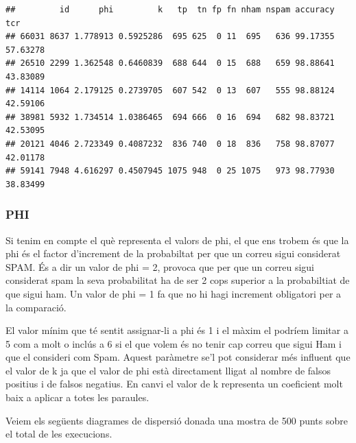 \documentclass[]{article}
\begin{document}
\begin{verbatim}
##         id      phi         k   tp  tn fp fn nham nspam accuracy      tcr
## 66031 8637 1.778913 0.5925286  695 625  0 11  695   636 99.17355 57.63278
## 26510 2299 1.362548 0.6460839  688 644  0 15  688   659 98.88641 43.83089
## 14114 1064 2.179125 0.2739705  607 542  0 13  607   555 98.88124 42.59106
## 38981 5932 1.734514 1.0386465  694 666  0 16  694   682 98.83721 42.53095
## 20121 4046 2.723349 0.4087232  836 740  0 18  836   758 98.87077 42.01178
## 59141 7948 4.616297 0.4507945 1075 948  0 25 1075   973 98.77930 38.83499
\end{verbatim}

\hypertarget{phi}{%
\subsubsection{PHI}\label{phi}}

Si tenim en compte el què representa el valors de phi, el que ens trobem
és que la phi és el factor d'increment de la probabiltat per que un
correu sigui considerat SPAM. És a dir un valor de phi = 2, provoca que
per que un correu sigui considerat spam la seva probabilitat ha de ser 2
cops superior a la probabiltiat de que sigui ham. Un valor de phi = 1 fa
que no hi hagi increment obligatori per a la comparació.

El valor mínim que té sentit assignar-li a phi és 1 i el màxim el
podríem limitar a 5 com a molt o inclús a 6 si el que volem és no tenir
cap correu que sigui Ham i que el consideri com Spam. Aquest paràmetre
se'l pot considerar més influent que el valor de k ja que el valor de
phi està directament lligat al nombre de falsos positius i de falsos
negatius. En canvi el valor de k representa un coeficient molt baix a
aplicar a totes les paraules.

Veiem els següents diagrames de dispersió donada una mostra de 500 punts
sobre el total de les execucions.
\end{document}
